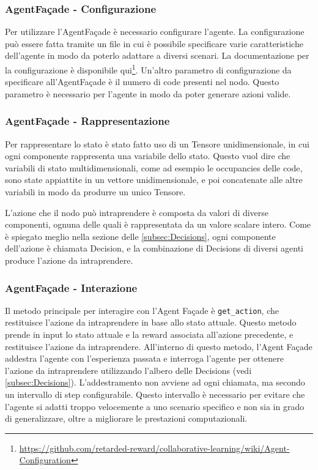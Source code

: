 \documentclass[conference]{IEEEtran}
\newcommand{\code}[1]{\texttt{#1}}
\begin{document}
\subsubsection{AgentFaçade - Configurazione} 
Per utilizzare l'AgentFaçade è necessario configurare l'agente. La configurazione può essere fatta tramite un file in cui è possibile specificare varie caratteristiche dell'agente in modo da poterlo adattare a diversi scenari. La documentazione per la configurazione è disponibile qui\footnote{\href{https://github.com/retarded-reward/collaborative-learning/wiki/Agent-Configuration}{https://github.com/retarded-reward/collaborative-learning/wiki/Agent-Configuration}}. Un'altro parametro di configurazione da specificare all'AgentFaçade è il numero di code presenti nel nodo. Questo parametro è necessario per l'agente in modo da poter generare azioni valide.
\subsubsection{AgentFaçade - Rappresentazione}
Per rappresentare lo stato è stato fatto uso di un Tensore unidimensionale, in cui
ogni componente rappresenta una variabile dello stato. Questo vuol dire che variabili
di stato multidimensionali, come ad esempio le occupancies delle code, sono state
appiattite in un vettore unidimensionale, e poi concatenate alle altre variabili in modo
da produrre un unico Tensore.

L'azione che il nodo può intraprendere è composta da valori di diverse componenti,
ognuna delle quali è rappresentata da un valore scalare intero. Come è spiegato meglio
nella sezione delle \autoref{subsec:Decisions}, ogni componente dell'azione è chiamata Decision, e 
la combinazione di Decisions di diversi agenti produce l'azione da intraprendere.
\subsubsection{AgentFaçade - Interazione}
Il metodo principale per interagire con l'Agent Façade è \code{get\_action}, che restituisce l'azione da intraprendere in base allo stato attuale. Questo metodo prende in input lo stato attuale e la reward associata all'azione precedente, e restituisce l'azione da intraprendere. All'interno di questo metodo, l'Agent Façade addestra l'agente con l'esperienza passata e interroga l'agente per ottenere l'azione da intraprendere utilizzando l'albero delle Decisions  (vedi \autoref{subsec:Decisions}). L'addestramento non avviene ad ogni chiamata, ma secondo un intervallo di step configurabile. Questo intervallo è necessario per evitare che l'agente si adatti troppo velocemente a uno scenario specifico e non sia in grado di generalizzare, oltre a migliorare le prestazioni computazionali.
\end{document}
